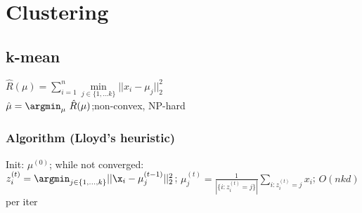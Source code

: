 \section*{Clustering}
\subsection*{k-mean}

$\hat{R}(\mu) = \sum_{i=1}^n \underset{j\in\{1,...k\}}{\operatorname{min}}||x_i-\mu_j||_2^2$\\
$\hat{\mu} =  \argmin_{\mu} ~ \hat{R}(\mu)$;non-convex, NP-hard \\
\subsubsection*{Algorithm (Lloyd's heuristic)}
Init: $\mu^{(0)}$; while not converged:\\
$z_i^{(t)}=\argmin_{j \in \{1,...,k\}}||\x_i-\mu_j^{(t-1)}||_2^2$;
$\mu_j^{(t)}=\frac{1}{|\{i:z_i^{(t)}=j\}|}\sum_{i:z_i^{(t)}=j}x_i$; $O(nkd)$per iter

